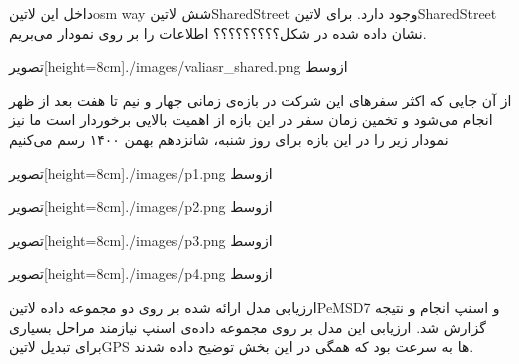  داخل این ‌لاتین{osm way} شش ‌لاتین{SharedStreet} وجود دارد. برای ‌لاتین{SharedStreet} نشان داده شده در شکل؟؟؟؟؟؟؟؟؟ اطلاعات را بر روی نمودار می‌بریم.

  ‌تصویر[height=8cm]{./images/valiasr_shared.png}
  ‌ازوسط

از آن جایی که اکثر سفرهای این شرکت در بازه‌ی زمانی جهار و نیم تا هفت بعد از ظهر انجام می‌شود و تخمین زمان سفر در این بازه از اهمیت بالایی برخوردار است ما نیز نمودار زیر را در این بازه برای روز شنبه، شانزدهم بهمن ۱۴۰۰ رسم می‌کنیم


  ‌تصویر[height=8cm]{./images/p1.png}
  ‌ازوسط


  ‌تصویر[height=8cm]{./images/p2.png}
  ‌ازوسط


  ‌تصویر[height=8cm]{./images/p3.png}
  ‌ازوسط


  ‌تصویر[height=8cm]{./images/p4.png}
  ‌ازوسط




ارزیابی مدل ارائه شده بر روی دو مجموعه داده ‌لاتین{PeMSD7} و اسنپ انجام و نتیجه گزارش شد. ارزیابی این مدل بر روی مجموعه داده‌ی اسنپ نیازمند مراحل بسیاری برای تبدیل ‌لاتین{GPS} ها به سرعت بود که همگی در این بخش توضیح داده شدند.
